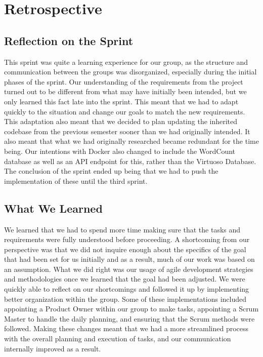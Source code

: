 \section{Retrospective}

\subsection{Reflection on the Sprint}
This sprint was quite a learning experience for our group, as the structure and communication between the \knox{} groups was disorganized, especially during the initial phases of the sprint. 
Our understanding of the requirements from the \knox{} project turned out to be different from what may have initially been intended, but we only learned this fact late into the sprint. 
This meant that we had to adapt quickly to the situation and change our goals to match the new requirements. 
This adaptation also meant that we decided to plan updating the inherited codebase from the previous semester sooner than we had originally intended. 
It also meant that what we had originally researched became redundant for the time being.
Our intentions with Docker also changed to include the WordCount database as well as an API endpoint for this, rather than the Virtuoso Database. 
The conclusion of the sprint ended up being that we had to push the implementation of these until the third sprint.

\subsection{What We Learned}
We learned that we had to spend more time making sure that the tasks and requirements were fully understood before proceeding. 
A shortcoming from our perspective was that we did not inquire enough about the specifics of the goal that had been set for us initially and as a result, much of our work was based on an assumption. 
What we did right was our usage of agile development strategies and methodologies once we learned that the goal had been adjusted. 
We were quickly able to reflect on our shortcomings and followed it up by implementing better organization within the group. 
Some of these implementations included appointing a Product Owner within our group to make tasks, appointing a Scrum Master to handle the daily planning, and ensuring that the Scrum methods were followed. 
Making these changes meant that we had a more streamlined process with the overall planning and execution of tasks, and our communication internally improved as a result.

